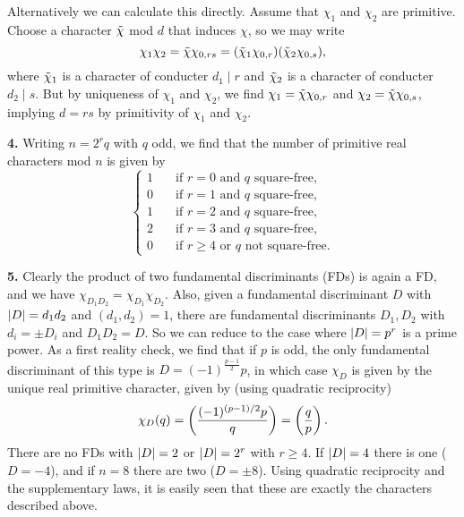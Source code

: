 \documentclass[a4paper,11pt]{article}
\begin{document}
Alternatively we can calculate this directly. Assume that $\chi_1$ and $\chi_2$
are primitive. Choose a character $\Tilde \chi$ mod $d$ that induces $\chi$, so
we may write $$\chi_1\chi_2 = \Tilde \chi \chi_{0,rs} = (\Tilde \chi_1
\chi_{0,r}) (\Tilde \chi_2 \chi_{0,s}),$$ where $\Tilde \chi_1$ is a character
of conducter $d_1 \mid r$ and $\Tilde \chi_2$ is a character of conducter $d_2
\mid s$. But by uniqueness of $\chi_1$ and $\chi_2$, we find $\chi_1 = \Tilde
\chi \chi_{0,r}$ and $\chi_2 = \Tilde \chi \chi_{0,s}$, implying $d = rs$ by
primitivity of $\chi_1$ and $\chi_2$. 

\textbf{4.} Writing $n = 2^r q$ with $q$ odd, we find that the number of primitive real
characters mod $n$ is given by 
\[
    \begin{cases}
        1 \quad &\text{if $r = 0$ and $q$ square-free}, \\
        0 \quad &\text{if $r = 1$ and $q$ square-free}, \\
        1 \quad &\text{if $r = 2$ and $q$ square-free}, \\
        2 \quad &\text{if $r = 3$ and $q$ square-free}, \\
        0 \quad &\text{if $r \geq 4$ or $q$ not square-free}. 
    \end{cases}
\]

\textbf{5.} Clearly the product of two fundamental discriminants (FDs) is again a FD,
and we have $\chi_{D_1 D_2} = \chi_{D_1}\chi_{D_2}$. Also, given a fundamental
discriminant $D$ with $\left\lvert D \right\rvert = d_1 d_2$ and $(d_1, d_2) = 1$, there are
fundamental discriminants $D_1, D_2$ with $d_i = \pm D_i$ and $D_1 D_2 = D$. 
So we can reduce to the case where
$\left\lvert D \right\rvert = p^r$ is a prime power. As a first reality check, we find that if $p$
is odd,
the only fundamental discriminant of this type is $D = (-1)^{\frac{p-1}2} p$,
in which case $\chi_D$ is given by the unique real primitive character, given by (using quadratic reciprocity)
$$\chi_D(q) = \left( \frac{(-1)^{(p-1)/2}p}{q} \right) = \left( \frac{q}{p} \right).$$
There are no FDs with $\left\lvert D \right\rvert =2$ or $\left\lvert D \right\rvert = 2^r$ with $r \geq 4$. If $\left\lvert D \right\rvert = 4$
there is one ($D = -4$), and if $n = 8$ there are two ($D = \pm 8$).
Using quadratic reciprocity and the supplementary laws, it is easily seen that these
are exactly the characters described above.

\contactend
\end{document}

